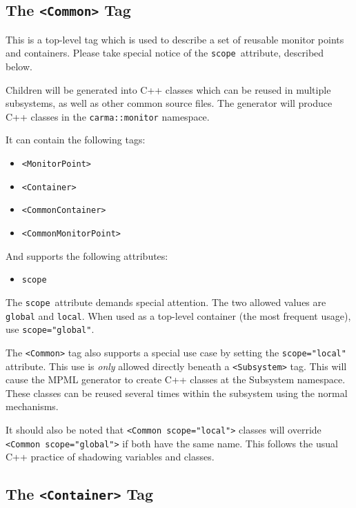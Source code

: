 \documentclass[letterpaper,12pt,oneside,pdftex]{article}
\newcommand{\mpml}[1]{\texttt{<#1>}}
\newcommand{\attr}[1]{\texttt{#1}}
\newenvironment{pitemize}{
\begin{itemize}
  \setlength{\itemsep}{1pt}
  \setlength{\parskip}{0pt}
  \setlength{\parsep}{0pt}
}{\end{itemize}}
\begin{document}
\subsection{The \mpml{Common} Tag}
\label{subsec:common-tag}

This is a top-level tag which is used to describe a set of reusable monitor
points and containers. Please take special notice of the \attr{scope}\
attribute, described below.

Children will be generated into C++ classes which can be reused in multiple
subsystems, as well as other common source files. The generator will produce C++
classes in the \texttt{carma::monitor} namespace.

It can contain the following tags:

\begin{pitemize}
\item \mpml{MonitorPoint}
\item \mpml{Container}
\item \mpml{CommonContainer}
\item \mpml{CommonMonitorPoint}
\end{pitemize}

And supports the following attributes:

\begin{pitemize}
\item \attr{scope}
\end{pitemize}

The \attr{scope}\ attribute demands special attention. The two allowed values
are \texttt{global} and \texttt{local}. When used as a top-level container (the
most frequent usage), use \texttt{scope="global"}.

The \mpml{Common} tag also supports a special use case by setting the
\texttt{scope="local"} attribute. This use is \emph{only} allowed directly
beneath a \mpml{Subsystem} tag. This will cause the MPML generator to create C++
classes at the Subsystem namespace. These classes can be reused several times
within the subsystem using the normal mechanisms.

It should also be noted that \mpml{Common scope="local"} classes will override
\mpml{Common scope="global"} if both have the same name. This follows the usual
C++ practice of shadowing variables and classes.

\subsection{The \mpml{Container} Tag}
\end{document}
